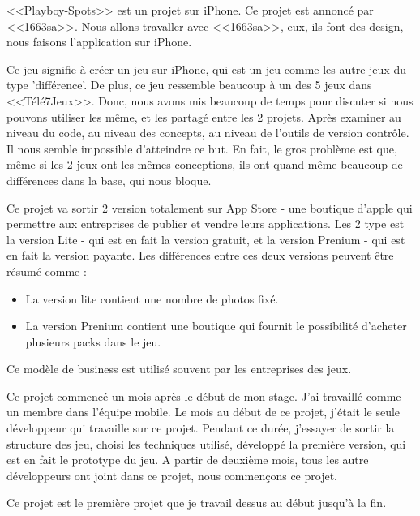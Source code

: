 <<Playboy-Spots>> est un projet sur iPhone. Ce projet est annoncé par <<1663sa>>. Nous allons travaller avec <<1663sa>>, eux, ils font des design, nous faisons l'application sur iPhone. 

Ce jeu signifie à créer un jeu sur iPhone, qui est un jeu comme les autre jeux du type 'différence'. De plus, ce jeu ressemble beaucoup à un des 5 jeux dans <<Télé7Jeux>>. Donc, nous avons mis beaucoup de temps pour discuter si nous pouvons utiliser les même, et les partagé entre les 2 projets. Après examiner au niveau du code, au niveau des concepts, au niveau de l'outils de version contrôle. Il nous semble impossible d'atteindre ce but. En fait, le gros problème est que, même si les 2 jeux ont les mêmes conceptions, ils ont quand même beaucoup de différences dans la base, qui nous bloque.

Ce projet va sortir 2 version totalement sur App Store - une boutique d'apple qui permettre aux entreprises de publier et vendre leurs applications. Les 2 type est la version Lite - qui est en fait la version gratuit, et la version Prenium - qui est en fait la version payante. Les différences entre ces deux versions peuvent être résumé comme : 
\begin{itemize}
	\item La version lite contient une nombre de photos fixé. 
	\item La version Prenium contient une boutique qui fournit le possibilité d'acheter plusieurs packs dans le jeu. 
\end{itemize}
Ce modèle de business est utilisé souvent par les entreprises des jeux. 


Ce projet commencé un mois après le début de mon stage. J'ai travaillé comme un membre dans l'équipe mobile. Le mois au début de ce projet, j'était le seule développeur qui travaille sur ce projet. Pendant ce durée, j'essayer de sortir la structure des jeu, choisi les techniques utilisé, développé la première version, qui est en fait le prototype du jeu. A partir de deuxième mois, tous les autre développeurs ont joint dans ce projet, nous commençons ce projet.

Ce projet est le première projet que je travail dessus au début jusqu'à la fin. 









